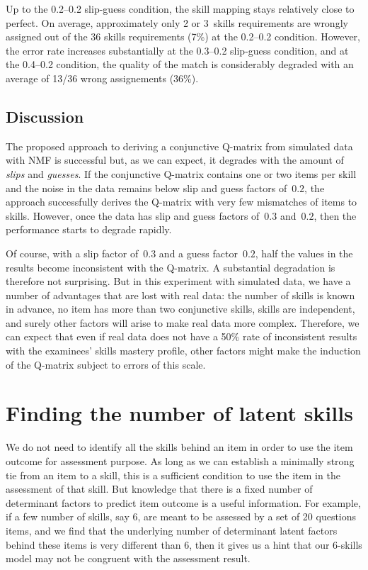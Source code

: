 Up to the 0.2--0.2 slip-guess condition, the skill mapping stays relatively close to perfect. On average, approximately only 2 or 3~skills requirements are wrongly assigned out of the 36 skills requirements (7\%) at the 0.2--0.2 condition.  However, the error rate increases substantially at the 0.3--0.2 slip-guess condition, and at the 0.4--0.2 condition, the quality of the match is considerably degraded with an average of 13/36 wrong assignements (36\%).

\subsection{Discussion}

The proposed approach to deriving a conjunctive Q-matrix from simulated data with NMF is successful but, as we can expect, it degrades with the amount of \textit{slips} and \textit{guesses}. If the conjunctive Q-matrix contains one or two items per skill and the noise in the data remains below slip and guess factors of~$0.2$, the approach successfully derives the Q-matrix with very few mismatches of items to skills.  However, once the data has slip and guess factors of~$0.3$ and~$0.2$, then the performance starts to degrade rapidly.

Of course, with a slip factor of~$0.3$ and a guess factor~$0.2$, half the values in the results become inconsistent with the Q-matrix. A substantial degradation is therefore not surprising.  But in this experiment with simulated data, we have a number of advantages that are lost with real data: the number of skills is known in advance, no item has more than two conjunctive skills, skills are independent, and surely other factors will arise to make real data more complex.  Therefore, we can expect that even if real data does not have a 50\% rate of inconsistent results with the examinees' skills mastery profile, other factors might make the induction of the Q-matrix subject to errors of this scale.

\section{Finding the number of latent skills}
\label{EDM2012}

We do not need to identify all the skills behind an item in order to use the item outcome for assessment purpose. As long as we can establish a minimally strong tie from an item to a skill, this is a sufficient condition to use the item in the assessment of that skill. But knowledge that there is a fixed number of determinant factors to predict item outcome is a useful information. For example, if a few number of skills, say 6, are meant to be assessed by a set of 20 questions items, and we find that the underlying number of determinant latent factors behind these items is very different than 6, then it gives us a hint that our 6-skills model may not be congruent with the assessment result.

